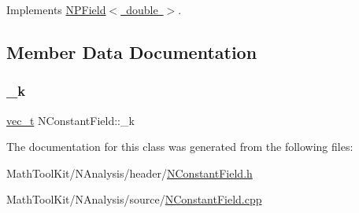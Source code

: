 Implements \mbox{\hyperlink{class_n_p_field_a6b92c4782bf41c0b81751821b93eb445}{N\+P\+Field$<$ double $>$}}.



\subsection{Member Data Documentation}
\mbox{\label{class_n_constant_field_adc7caf84cc8e117807c19c95cb47d1bc}} 
\subsubsection{\texorpdfstring{\_k}{\_k}}
{\footnotesize\ttfamily \mbox{\hyperlink{_n_vector_8h_a0a2cfc67e738a3d73e4f12098c4c07f6}{vec\+\_\+t}} N\+Constant\+Field\+::\+\_\+k\hspace{0.3cm}{\ttfamily [protected]}}



The documentation for this class was generated from the following files\+:\begin{DoxyCompactItemize}
\item 
Math\+Tool\+Kit/\+N\+Analysis/header/\mbox{\hyperlink{_n_constant_field_8h}{N\+Constant\+Field.\+h}}\item 
Math\+Tool\+Kit/\+N\+Analysis/source/\mbox{\hyperlink{_n_constant_field_8cpp}{N\+Constant\+Field.\+cpp}}\end{DoxyCompactItemize}
